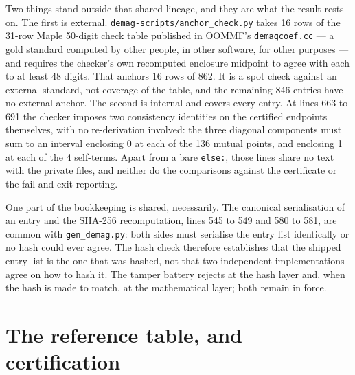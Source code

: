 \documentclass[11pt]{amsart}
\theoremstyle{plain}
\theoremstyle{definition}
\theoremstyle{remark}
\begin{document}
Two things stand outside that shared lineage, and they are what the result
rests on. The first is external. \texttt{demag-scripts/anchor\_check.py}
takes 16 rows of the 31-row Maple 50-digit check table published in OOMMF's
\texttt{demagcoef.cc} --- a gold standard computed by other people, in other
software, for other purposes --- and requires the checker's own recomputed
enclosure midpoint to agree with each to at least 48 digits. That anchors 16
rows of 862. It is a spot check against an external standard, not coverage
of the table, and the remaining 846 entries have no external anchor. The
second is internal and covers every entry. At lines 663 to 691 the checker
imposes two consistency identities on the certified endpoints themselves,
with no re-derivation involved: the three diagonal components must sum to an
interval enclosing 0 at each of the 136 mutual points, and enclosing 1 at
each of the 4 self-terms. Apart from a bare \texttt{else:}, those lines
share no text with the private files, and neither do the comparisons against
the certificate or the fail-and-exit reporting.

One part of the bookkeeping is shared, necessarily. The canonical
serialisation of an entry and the SHA-256 recomputation, lines 545 to 549
and 580 to 581, are common with \texttt{gen\_demag.py}: both sides must
serialise the entry list identically or no hash could ever agree. The hash
check therefore establishes that the shipped entry list is the one that was
hashed, not that two independent implementations agree on how to hash it.
The tamper battery rejects at the hash layer and, when the hash is made to
match, at the mathematical layer; both remain in force.

\section{The reference table, and certification}\label{sec:cert}
\end{document}
